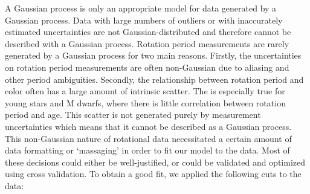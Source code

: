 A Gaussian process is only an appropriate model for data generated by a
Gaussian process.
Data with large numbers of outliers or with inaccurately estimated
uncertainties are not Gaussian-distributed and therefore cannot be described
with a Gaussian process.
Rotation period measurements are rarely generated by a Gaussian process for
two main reasons.
Firstly, the uncertainties on rotation period measurements are often
non-Gaussian due to aliasing and other period ambiguities.
Secondly, the relationship between rotation period and color often has a large
amount of intrinsic scatter.
The is especially true for young stars and M dwarfs, where there is little
correlation between rotation period and age.
This scatter is not generated purely by measurement uncertainties which means
that it cannot be described as a Gaussian process.
This non-Gaussian nature of rotational data necessitated a certain amount of
data formatting or `massaging' in order to fit our model to the data.
Most of these decisions could either be well-justified, or could be validated
and optimized using cross validation.
To obtain a good fit, we applied the following cuts to the data:

